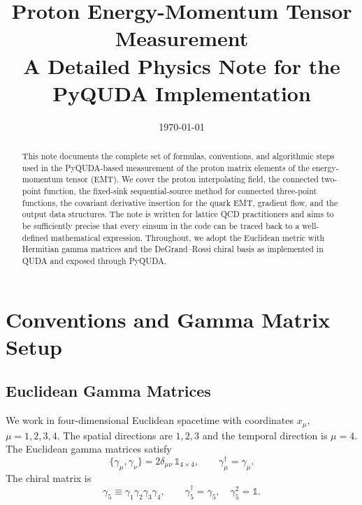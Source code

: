 \documentclass[11pt,a4paper]{article}
\title{\textbf{Proton Energy-Momentum Tensor Measurement}\\[4pt]
       \large A Detailed Physics Note for the PyQUDA Implementation}
\author{}
\date{\today}
\begin{document}
\maketitle

\begin{abstract}
This note documents the complete set of formulas, conventions, and algorithmic steps
used in the PyQUDA-based measurement of the proton matrix elements of the
energy-momentum tensor (EMT).  We cover the proton interpolating field, the connected
two-point function, the fixed-sink sequential-source method for connected three-point
functions, the covariant derivative insertion for the quark EMT, gradient flow, and the
output data structures.  The note is written for lattice QCD practitioners and aims to
be sufficiently precise that every einsum in the code can be traced back to a
well-defined mathematical expression.  Throughout, we adopt the Euclidean metric with
Hermitian gamma matrices and the DeGrand--Rossi chiral basis as implemented in QUDA
and exposed through PyQUDA.
\end{abstract}

\tableofcontents

\section{Conventions and Gamma Matrix Setup}

\subsection{Euclidean Gamma Matrices}

We work in four-dimensional Euclidean spacetime with coordinates
$x_{\mu}$, $\mu = 1,2,3,4$.  The spatial directions are $1,2,3$ and the temporal
direction is $\mu = 4$.  The Euclidean gamma matrices satisfy
\begin{equation}
  \{\gamma_{\mu}, \gamma_{\nu}\} = 2\delta_{\mu\nu}\,\mathbb{1}_{4\times 4},
  \qquad \gamma_{\mu}^{\dagger} = \gamma_{\mu}.
\end{equation}
The chiral matrix is
\begin{equation}
  \gamma_{5} \equiv \gamma_{1}\gamma_{2}\gamma_{3}\gamma_{4},
  \qquad \gamma_{5}^{\dagger} = \gamma_{5},\quad \gamma_{5}^{2} = \mathbb{1}.
\end{equation}
\end{document}
